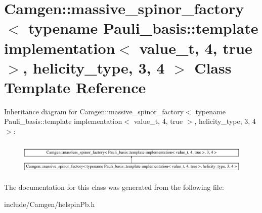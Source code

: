 \hypertarget{a00349}{}\section{Camgen\+:\+:massive\+\_\+spinor\+\_\+factory$<$ typename Pauli\+\_\+basis\+:\+:template implementation$<$ value\+\_\+t, 4, true $>$, helicity\+\_\+type, 3, 4 $>$ Class Template Reference}
\label{a00349}
Inheritance diagram for Camgen\+:\+:massive\+\_\+spinor\+\_\+factory$<$ typename Pauli\+\_\+basis\+:\+:template implementation$<$ value\+\_\+t, 4, true $>$, helicity\+\_\+type, 3, 4 $>$\+:\begin{figure}[H]
\begin{center}
\leavevmode
\includegraphics[height=1.564246cm]{a00349}
\end{center}
\end{figure}


The documentation for this class was generated from the following file\+:\begin{DoxyCompactItemize}
\item 
include/\+Camgen/helspin\+Pb.\+h\end{DoxyCompactItemize}
